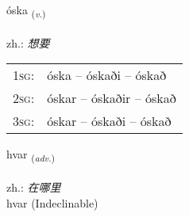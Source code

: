 \documentclass[frontgrid, backgrid]{flacards}\usepackage[]{graphicx}\usepackage[]{xcolor}
\begin{document}
\renewcommand{\flhead}{\vskip5pt \fboxsep=0pt {\small\bfseries\footnotesize Sagnorð | 动词}}
\renewcommand{\fcfoot}{\vskip5pt \fboxsep=0pt \hspace{2pt}{\small\bfseries\footnotesize 1K}}

\renewcommand{\blhead}{\vskip5pt {\small\bfseries\footnotesize Sagnorð | 动词 }}
\renewcommand{\bcfoot}{\vskip5pt \hspace{2pt}{\small\bfseries\footnotesize 1K}}


{óska \small{\textsubscript{(\textit{v.})}} \\[1ex] %
\textphonetic{[ouska]} \\
zh.: \emph{想要} \\  [2ex]
\renewcommand*{\arraystretch}{0.8}
\begin{tabular}{p{1cm}l}
\textsc{1sg}: & óska -- óskaði -- óskað \\ 
\textsc{2sg}: & óskar -- óskaðir -- óskað \\ 
\textsc{3sg}: & óskar -- óskaði -- óskað \\ 
\end{tabular}
}


\renewcommand{\flhead}{\vskip5pt \fboxsep=0pt {\small\bfseries\footnotesize Atviksorð | 副词}}
\renewcommand{\fcfoot}{\vskip5pt \fboxsep=0pt \hspace{2pt}{\small\bfseries\footnotesize 1K}}

\renewcommand{\blhead}{\vskip5pt {\small\bfseries\footnotesize Atviksorð | 副词 }}
\renewcommand{\bcfoot}{\vskip5pt \hspace{2pt}{\small\bfseries\footnotesize 1K}}


{hvar \small{\textsubscript{(\textit{adv.})}} \\[1ex]
\textphonetic{[kʰvaːr]} \\
zh.: \emph{在哪里} \\  [2ex]
hvar (Indeclinable)}

\renewcommand{\flhead}{\vskip5pt \fboxsep=0pt {\small\bfseries\footnotesize Nafnorð | 名词}}
\renewcommand{\fcfoot}{\vskip5pt \fboxsep=0pt \hspace{2pt}{\small\bfseries\footnotesize 1K}}
\end{document}
